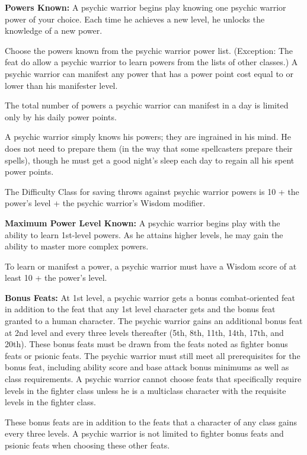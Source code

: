 \textbf{Powers Known:} A psychic warrior begins play knowing one psychic warrior power of your choice. Each time he achieves a new level, he unlocks the knowledge of a new power.

Choose the powers known from the psychic warrior power list. (Exception: The feat  do allow a psychic warrior to learn powers from the lists of other classes.) A psychic warrior can manifest any power that has a power point cost equal to or lower than his manifester level.

The total number of powers a psychic warrior can manifest in a day is limited only by his daily power points.

A psychic warrior simply knows his powers; they are ingrained in his mind. He does not need to prepare them (in the way that some spellcasters prepare their spells), though he must get a good night's sleep each day to regain all his spent power points.

The Difficulty Class for saving throws against psychic warrior powers is 10 + the power's level + the psychic warrior's Wisdom modifier.

\textbf{Maximum Power Level Known:} A psychic warrior begins play with the ability to learn 1st-level powers. As he attains higher levels, he may gain the ability to master more complex powers.

To learn or manifest a power, a psychic warrior must have a Wisdom score of at least 10 + the power's level.

\textbf{Bonus Feats:} At 1st level, a psychic warrior gets a bonus combat-oriented feat in addition to the feat that any 1st level character gets and the bonus feat granted to a human character. The psychic warrior gains an additional bonus feat at 2nd level and every three levels thereafter (5th, 8th, 11th, 14th, 17th, and 20th). These bonus feats must be drawn from the feats noted as fighter bonus feats or psionic feats. The psychic warrior must still meet all prerequisites for the bonus feat, including ability score and base attack bonus minimums as well as class requirements. A psychic warrior cannot choose feats that specifically require levels in the fighter class unless he is a multiclass character with the requisite levels in the fighter class.

These bonus feats are in addition to the feats that a character of any class gains every three levels. A psychic warrior is not limited to fighter bonus feats and psionic feats when choosing these other feats.

